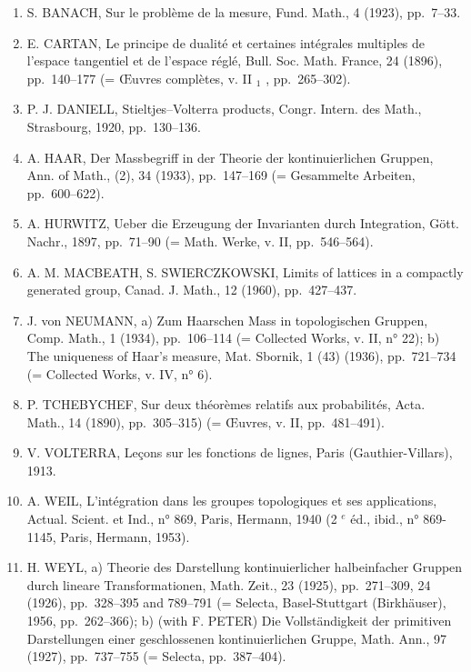 
\begin{enumerate}
\def\labelenumi{(\Roman{enumi})}
\item
  S. BANACH, Sur le problème de la mesure, Fund. Math., 4 (1923), pp.~7--33.
\item
  E. CARTAN, Le principe de dualité et certaines intégrales multiples de l'espace tangentiel et de l'espace réglé, Bull. Soc. Math. France, 24 (1896), pp.~140--177 (= Œuvres complètes, v. II \(_{1}\) , pp.~265--302).
\item
  P. J. DANIELL, Stieltjes--Volterra products, Congr. Intern. des Math., Strasbourg, 1920, pp.~130--136.
\item
  A. HAAR, Der Massbegriff in der Theorie der kontinuierlichen Gruppen, Ann. of Math., (2), 34 (1933), pp.~147--169 (= Gesammelte Arbeiten, pp.~600--622).
\item
  A. HURWITZ, Ueber die Erzeugung der Invarianten durch Integration, Gött. Nachr., 1897, pp.~71--90 (= Math. Werke, v. II, pp.~546--564).
\item
  A. M. MACBEATH, S. SWIERCZKOWSKI, Limits of lattices in a compactly generated group, Canad. J. Math., 12 (1960), pp.~427--437.
\item
  J. von NEUMANN, a) Zum Haarschen Mass in topologischen Gruppen, Comp. Math., 1 (1934), pp.~106--114 (= Collected Works, v. II, n° 22); b) The uniqueness of Haar's measure, Mat. Sbornik, 1 (43) (1936), pp.~721--734 (= Collected Works, v. IV, n° 6).
\item
  P. TCHEBYCHEF, Sur deux théorèmes relatifs aux probabilités, Acta. Math., 14 (1890), pp.~305--315) (= Œuvres, v. II, pp.~481--491).
\item
  V. VOLTERRA, Leçons sur les fonctions de lignes, Paris (Gauthier-Villars), 1913.
\item
  A. WEIL, L'intégration dans les groupes topologiques et ses applications, Actual. Scient. et Ind., n° 869, Paris, Hermann, 1940 (2 \(^{e}\) éd., ibid., n° 869-1145, Paris, Hermann, 1953).
\item
  H. WEYL, a) Theorie des Darstellung kontinuierlicher halbeinfacher Gruppen durch lineare Transformationen, Math. Zeit., 23 (1925), pp.~271--309, 24 (1926), pp.~328--395 and 789--791 (= Selecta, Basel-Stuttgart (Birkhäuser), 1956, pp.~262--366); b) (with F. PETER) Die Vollständigkeit der primitiven Darstellungen einer geschlossenen kontinuierlichen Gruppe, Math. Ann., 97 (1927), pp.~737--755 (= Selecta, pp.~387--404).
\end{enumerate}

